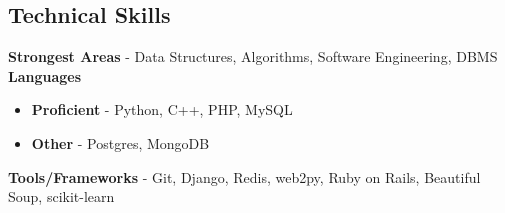 \documentclass[margin, centered]{res}
\begin{document}
\begin{resume}
\section{Technical \hspace{2mm} Skills}
\textbf{Strongest Areas} - Data Structures, Algorithms, Software Engineering, DBMS \\
\textbf{Languages}
\begin{itemize}
	\item \textbf{Proficient} - Python, C++, PHP, MySQL
	\item \textbf{Other} - Postgres, MongoDB
\end{itemize} 
\textbf{Tools/Frameworks} - Git, Django, Redis, web2py, Ruby on Rails, Beautiful Soup, scikit-learn




\end{resume}
\end{document}
